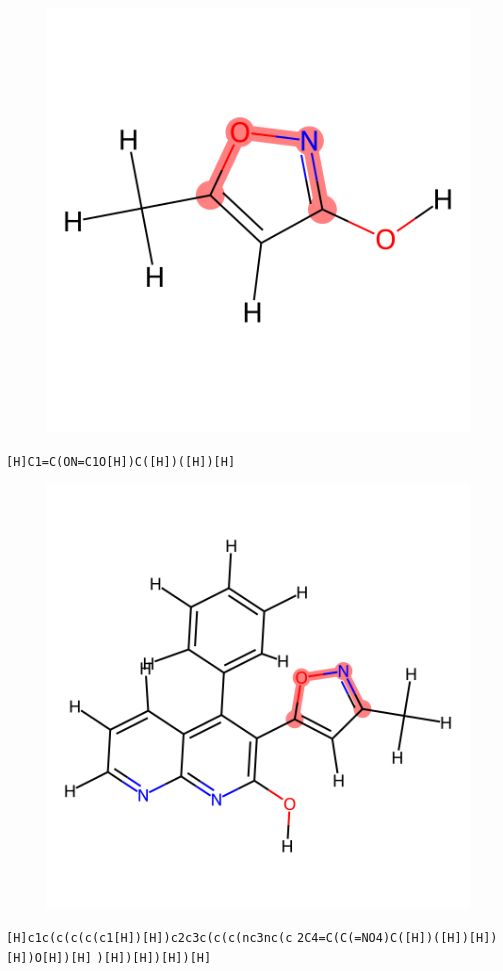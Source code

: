 \documentclass{article}
\begin{document}
\begin{figure}[ht]
\centering
    \includegraphics{mol276.png}
\end{figure}
\verb|[H]C1=C(ON=C1O[H])C([H])([H])[H]|

\begin{figure}[ht]
\centering
    \includegraphics{mol277.png}
\end{figure}
\verb|[H]c1c(c(c(c(c1[H])[H])c2c3c(c(c(nc3nc(c| \verb|2C4=C(C(=NO4)C([H])([H])[H])[H])O[H])[H]| \verb|)[H])[H])[H])[H]|
\end{document}

